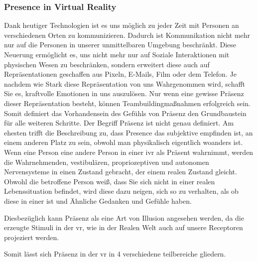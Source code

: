 \documentclass[a4paper,11pt]{article}%
\renewcommand{\\}{\vspace*{0.5\baselineskip} \newline}
\begin{document}
{			\subsubsection{Presence in Virtual Reality}
			
			Dank heutiger Technologien ist es uns möglich zu jeder Zeit mit Personen an verschiedenen Orten zu kommunizieren. Dadurch ist Kommunikation nicht mehr nur auf die Personen in unserer unmittelbaren Umgebung beschränkt. 
			Diese Neuerung ermöglicht es, uns nicht mehr nur auf \grqq Soziale Interaktionen \glqq mit physischen Wesen zu beschränken, sondern erweitert diese auch auf Repräsentationen geschaffen aus Pixeln, E-Mails, Film oder dem Telefon. Je nachdem wie Stark diese Repräsentation von uns Wahrgenommen wird, schafft Sie es, kraftvolle Emotionen in uns auszulösen.\citep[p. 4-6]{biocca2002defining}\\
			Nur wenn eine gewisse Präsenz dieser Repräsentation besteht, können Teambuildingmaßnahmen erfolgreich sein. Somit definiert das Vorhandensein des Gefühls von Präsenz den Grundbaustein für alle weiteren Schritte.\\
			Der Begriff \grqq Präsenz \glqq ist nicht genau definiert. Am ehesten trifft die Beschreibung zu, dass Presence das subjektive empfinden ist, an einem anderen Platz zu sein, obwohl man physikalisch eigentlich woanders ist. \citep[p. 1]{witmer1998measuring}\\
			Wenn eine Person eine andere Person in einer \ac{ivr} als Präsent wahrnimmt, werden die Wahrnehmenden, vestibulären, propriozeptiven und autonomen Nervensysteme in einen Zustand gebracht, der einem realen Zustand gleicht. Obwohl die betroffene Person weiß, dass Sie sich nicht in einer realen Lebenssituation befindet, wird diese dazu neigen, sich so zu verhalten, als ob diese in einer ist und Ähnliche Gedanken und Gefühle haben. \citep{slater2003note}

Diesbezüglich kann Präsenz als eine Art von Illusion angesehen werden, da die erzeugte Stimuli in der \ac{vr}, wie in der Realen Welt auch auf unsere Receptoren projeziert werden.

Somit lässt sich Präsenz in der \ac{vr} in 4 verschiedene teilbereiche gliedern.

}
\end{document}
